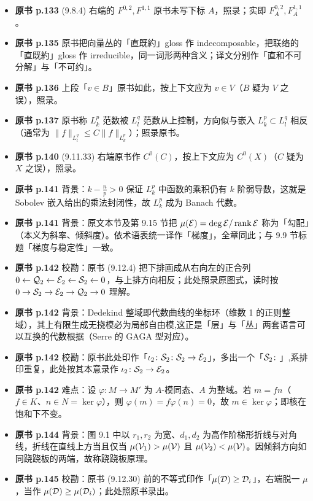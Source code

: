 \begin{itemize}[leftmargin=2.4em,itemsep=4pt,label={\textbullet}]
\item \textbf{原书 p.133} (9.8.4) 右端的 $F^{0,2},F^{1,1}$ 原书未写下标 $A$，照录；实即 $F_A^{0,2},F_A^{1,1}$。
\item \textbf{原书 p.135} 原书把向量丛的「直既約」gloss 作 indecomposable，把联络的「直既約」gloss 作 irreducible，同一词形两种含义；译文分别作「直和不可分解」与「不可约」。
\item \textbf{原书 p.136} 上段「$v\in B$」原书如此，按上下文应为 $v\in V$（$B$ 疑为 $V$ 之误），照录。
\item \textbf{原书 p.137} 原书称 $L^p_k$ 范数被 $L^q_l$ 范数从上控制，方向似与嵌入 $L^p_k\subset L^q_l$ 相反（通常为 $\|f\|_{L^q_l}\le C\|f\|_{L^p_k}$）；照录原书。
\item \textbf{原书 p.140} (9.11.33) 右端原书作 $C^0(C)$，按上下文应为 $C^0(X)$（$C$ 疑为 $X$ 之误），照录。
\item \textbf{原书 p.141} 背景：$k-\frac np>0$ 保证 $L^p_k$ 中函数的乘积仍有 $k$ 阶弱导数，这就是 Sobolev 嵌入给出的乘法封闭性，故 $L^p_k$ 成为 Banach 代数。
\item \textbf{原书 p.141} 背景：原文本节及第 9.15 节把 $\mu(\mathcal{E})=\deg\mathcal{E}/\operatorname{rank}\mathcal{E}$ 称为「勾配」（本义为斜率、倾斜度）。依术语表统一译作「梯度」，全章同此；与 9.9 节标题「梯度与稳定性」一致。
\item \textbf{原书 p.142} 校勘：原书 (9.12.4) 把下排画成从右向左的正合列 $0\leftarrow\mathcal{Q}_2\leftarrow\mathcal{E}_2\leftarrow\mathcal{S}_2\leftarrow0$，与上排方向相反；此处照录原图式，读时按 $0\to\mathcal{S}_2\to\mathcal{E}_2\to\mathcal{Q}_2\to0$ 理解。
\item \textbf{原书 p.142} 背景：Dedekind 整域即代数曲线的坐标环（维数 1 的正则整域），其上有限生成无挠模必为局部自由模,这正是「层」与「丛」两套语言可以互换的代数根据（Serre 的 GAGA 型对应）。
\item \textbf{原书 p.142} 校勘：原书此处印作「$\iota_2\colon\mathcal{S}_2\colon\mathcal{S}_2\to\mathcal{E}_2$」，多出一个「$\mathcal{S}_2\colon$」,系排印重复，此处按其本意录作 $\iota_2\colon\mathcal{S}_2\to\mathcal{E}_2$。
\item \textbf{原书 p.142} 难点：设 $\varphi\colon M\to M'$ 为 $A$-模同态、$A$ 为整域。若 $m=fn$（$f\in K$、$n\in N=\ker\varphi$），则 $\varphi(m)=f\varphi(n)=0$，故 $m\in\ker\varphi$；即核在饱和下不变。
\item \textbf{原书 p.144} 背景：图 9.1 中以 $r_1,r_2$ 为宽、$d_1,d_2$ 为高作阶梯形折线与对角线，折线在直线上方当且仅当 $\mu(\mathcal{V}_1)>\mu(\mathcal{V})$ 且 $\mu(\mathcal{V}_2)<\mu(\mathcal{V})$。因倾斜方向如同跷跷板的两端，故称跷跷板原理。
\item \textbf{原书 p.145} 校勘：原书 (9.12.30) 前的不等式印作「$\mu(\mathcal{D})\ge\mathcal{D}_i$」，右端脱一 $\mu$，当作 $\mu(\mathcal{D})\ge\mu(\mathcal{D}_i)$；此处照原书录出。

\end{itemize}
